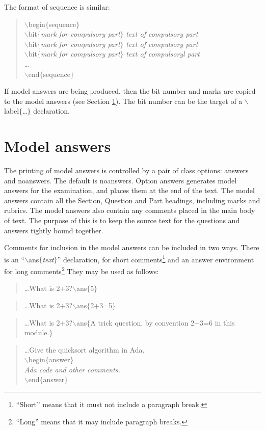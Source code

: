 \documentclass[12pt,twoside]{article}
\newcommand{\kwd}[1]{\textsf{#1}}
\newcommand{\cmd}[1]{$\backslash$\textsf{#1}}
\newcommand{\tcmd}[3]{\cmd{#1}$\{$#3{#2}$\}$}
\newcommand{\dcmd}[2]{\tcmd{#1}{#2}{\emph}}
\newcommand{\pcmd}[2]{\tcmd{#1}{#2}{\kwd}}
\begin{document}
The format of \kwd{sequence} is similar:
\begin{quote}
  \pcmd{begin}{sequence}\\
    \dcmd{bit}{mark for compulsory part}
      \emph{text of compulsory part}\\
    \dcmd{bit}{mark for compulsory part}
      \emph{text of compulsory part}\\
    \dcmd{bit}{mark for compulsory part}
      \emph{text of compulsoryl part}\\
    \ldots\\
  \pcmd{end}{sequence}
\end{quote}
If model answers are being produced, then the bit number and marks are
copied to the model answers (see Section \ref{ModelAnswer:S}).  The
bit number can be the target of a \pcmd{label}{\ldots} declaration.

\section{Model answers}\label{ModelAnswer:S}

The printing of model answers is controlled by a pair of class
options: \kwd{answers} and \kwd{noanswers}.  The default is
\kwd{noanswers}.  Option \kwd{answers} generates model answers for the
examination, and places them at the end of the text.  The model
answers contain all the Section, Question and Part headings, including
marks and rubrics.  The model answers also contain any comments placed
in the main body of text.  The purpose of this is to keep the source
text for the questions and answers tightly bound together.

Comments for inclusion in the model answers can be included in two
ways.  There is an ``\dcmd{ans}{text}'' declaration, for short
comments\footnote{``Short'' means that it must not include a paragraph
  break.} and an \kwd{answer} environment for long
comments\footnote{``Long'' means that it may include paragraph
  breaks.}  They may be used as follows:
\begin{quote}\sffamily
\ldots What is 2+3?\pcmd{ans}{5}
\end{quote}
\begin{quote}\sffamily
\ldots What is 2+3?\pcmd{ans}{2+3=5}
\end{quote}
\begin{quote}\sffamily
\ldots What is 2+3?\pcmd{ans}{A trick question, by convention 2+3=6 in
                                this module.}
\end{quote}
\begin{quote}
{\sffamily
\ldots Give the quicksort algorithm in Ada.}\\
\pcmd{begin}{answer}\\
\hspace*{2em}\emph{Ada code and other comments.}\\
\pcmd{end}{answer}\\
\end{quote}
\end{document}
